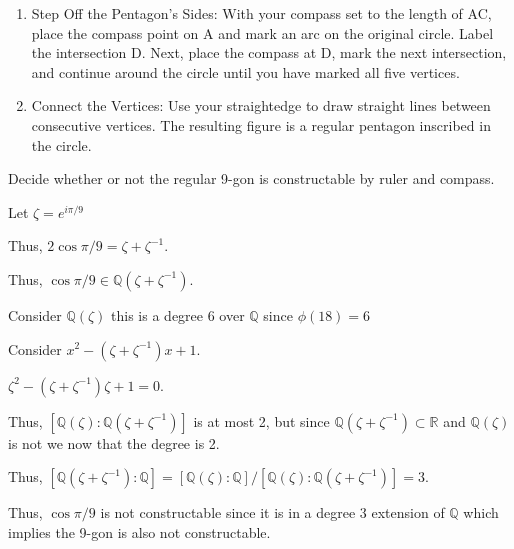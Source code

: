 \documentclass[12pt, letterpaper]{article}
\newcommand{\R}{\mathbb{R}}
\newcommand{\Q}{\mathbb{Q}}
\begin{document}
\begin{problemproof}
\begin{enumerate}
        \item Step Off the Pentagon's Sides:
        With your compass set to the length of AC, place the compass point on A and mark an arc on the original circle. Label the intersection D. Next, place the compass at D, mark the next intersection, and continue around the circle until you have marked all five vertices.
        
        \item Connect the Vertices:
        Use your straightedge to draw straight lines between consecutive vertices. The resulting figure is a regular pentagon inscribed in the circle.
    \end{enumerate}
    

\end{problemproof}

\begin{problem}{}
    Decide whether or not the regular 9-gon is constructable by ruler and compass.
\end{problem}
\begin{problemproof}
    Let $\zeta=e^{i\pi/9}$

    Thus, $2\cos{\pi/9}=\zeta+\zeta^{-1}$.

    Thus, $\cos{\pi/9} \in \Q(\zeta + \zeta^{-1})$.

    Consider $\Q(\zeta)$ this is a degree 6 over $\Q$ since $\phi(18)=6$

    Consider $x^2-(\zeta + \zeta^{-1})x+1$.

    $\zeta^2-(\zeta + \zeta^{-1})\zeta+1=0$.

    Thus, $[\Q(\zeta) : \Q(\zeta + \zeta^{-1})]$ is at most 2, but since $\Q(\zeta + \zeta^{-1}) \subset \R$ and $\Q(\zeta)$ is not we now that the degree is 2.

    Thus, $[\Q(\zeta + \zeta^{-1}): \Q] = [\Q(\zeta) : \Q]/[\Q(\zeta) : \Q(\zeta + \zeta^{-1})] = 3$.

    Thus, $\cos{\pi/9}$ is not constructable since it is in a degree 3 extension of $\Q$ which implies the 9-gon is also not constructable.
\end{problemproof}
\end{document}
